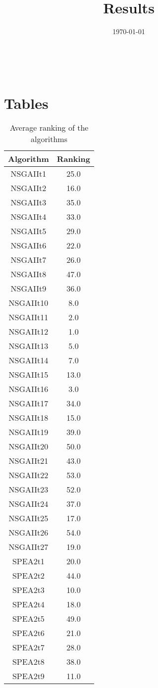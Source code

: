 \documentclass{article}
\title{Results}
\author{}
\date{\today}
\begin{document}
\oddsidemargin 0in \topmargin 0in\maketitle
\
\section{Tables}
\begin{table}[!htp]
\centering
\caption{Average ranking of the algorithms}
\begin{tabular}{c|c}
Algorithm&Ranking\\
\hline
NSGAIIt1&25.0\\
NSGAIIt2&16.0\\
NSGAIIt3&35.0\\
NSGAIIt4&33.0\\
NSGAIIt5&29.0\\
NSGAIIt6&22.0\\
NSGAIIt7&26.0\\
NSGAIIt8&47.0\\
NSGAIIt9&36.0\\
NSGAIIt10&8.0\\
NSGAIIt11&2.0\\
NSGAIIt12&1.0\\
NSGAIIt13&5.0\\
NSGAIIt14&7.0\\
NSGAIIt15&13.0\\
NSGAIIt16&3.0\\
NSGAIIt17&34.0\\
NSGAIIt18&15.0\\
NSGAIIt19&39.0\\
NSGAIIt20&50.0\\
NSGAIIt21&43.0\\
NSGAIIt22&53.0\\
NSGAIIt23&52.0\\
NSGAIIt24&37.0\\
NSGAIIt25&17.0\\
NSGAIIt26&54.0\\
NSGAIIt27&19.0\\
SPEA2t1&20.0\\
SPEA2t2&44.0\\
SPEA2t3&10.0\\
SPEA2t4&18.0\\
SPEA2t5&49.0\\
SPEA2t6&21.0\\
SPEA2t7&28.0\\
SPEA2t8&38.0\\
SPEA2t9&11.0\\

\end{tabular}
\end{table}
\end{document}
